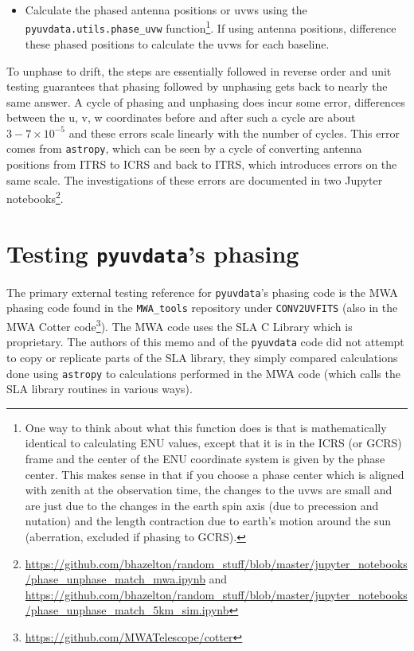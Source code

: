 \documentclass[11pt, oneside]{article}   	%
\begin{document}
\begin{itemize}
\item{Calculate the phased antenna positions or uvws using the \verb!pyuvdata.utils.phase_uvw! function\footnote{One way to think about what this function does is that is mathematically identical to calculating ENU values, except that it is in the ICRS (or GCRS) frame and the center of the ENU coordinate system is given by the phase center. This makes sense in that if you choose a phase center which is aligned with zenith at the observation time, the changes to the uvws are small and are just due to the changes in the earth spin axis (due to precession and nutation) and the length contraction due to earth's motion around the sun (aberration, excluded if phasing to GCRS).}. If using antenna positions, difference these phased positions to calculate the uvws for each baseline.}
\end{itemize}

To unphase to drift, the steps are essentially followed in reverse order and unit testing guarantees that phasing followed by unphasing gets back to nearly the same answer. A cycle of phasing and unphasing does incur some error, differences between the u, v, w coordinates before and after such a cycle are about ${3-7 \times 10^{-5}}$ and these errors scale linearly with the number of cycles. This error comes from \texttt{astropy}, which can be seen by a cycle of converting antenna positions from ITRS to ICRS and back to ITRS, which introduces errors on the same scale. The investigations of these errors are documented in two Jupyter notebooks\footnote{\url{https://github.com/bhazelton/random_stuff/blob/master/jupyter_notebooks/phase_unphase_match_mwa.ipynb} and \url{https://github.com/bhazelton/random_stuff/blob/master/jupyter_notebooks/phase_unphase_match_5km_sim.ipynb}}.

\section{Testing \texttt{pyuvdata}'s phasing}

The primary external testing reference for \texttt{pyuvdata}'s phasing code is the MWA phasing code found in the \verb!MWA_tools! repository under \texttt{CONV2UVFITS} (also in the MWA Cotter code\footnote{\url{https://github.com/MWATelescope/cotter}}). The MWA code uses the SLA C Library which is proprietary. The authors of this memo and of the \texttt{pyuvdata} code did not attempt to copy or replicate parts of the SLA library, they simply compared calculations done using \texttt{astropy} to calculations performed in the MWA code (which calls the SLA library routines in various ways).
\end{document}
